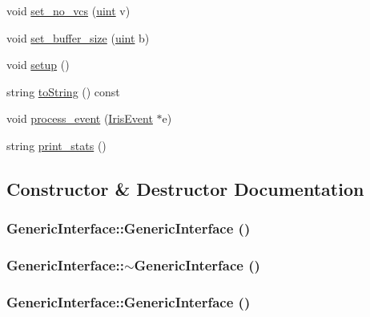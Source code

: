 \begin{CompactItemize}
void \hyperlink{classGenericInterface_10e019a3cafe243d63587656afc5e79f}{set\_\-no\_\-vcs} (\hyperlink{outputBuffer_8h_91ad9478d81a7aaf2593e8d9c3d06a14}{uint} v)
\item 
void \hyperlink{classGenericInterface_fd1cd1ccd6d355852bee1677cd8b56df}{set\_\-buffer\_\-size} (\hyperlink{outputBuffer_8h_91ad9478d81a7aaf2593e8d9c3d06a14}{uint} b)
\item 
void \hyperlink{classGenericInterface_1aaf2e40e433e913e7ea9cb68693fa7c}{setup} ()
\item 
string \hyperlink{classGenericInterface_ae1400fce0c7ba48965596ec172e474b}{toString} () const 
\item 
void \hyperlink{classGenericInterface_d56b8876204889d3c096fccd61b16b9e}{process\_\-event} (\hyperlink{classIrisEvent}{IrisEvent} $\ast$e)
\item 
string \hyperlink{classGenericInterface_b1be26f08d69932b1ac08094985eb5d6}{print\_\-stats} ()
\end{CompactItemize}


\subsection{Constructor \& Destructor Documentation}
\hypertarget{classGenericInterface_6614ccfa832a38b9cd2087f28527fa57}{
\subsubsection[{GenericInterface}]{\setlength{\rightskip}{0pt plus 5cm}GenericInterface::GenericInterface ()}}
\label{classGenericInterface_6614ccfa832a38b9cd2087f28527fa57}


\hypertarget{classGenericInterface_8543b504083542c36dc7f11e00895390}{
\subsubsection[{$\sim$GenericInterface}]{\setlength{\rightskip}{0pt plus 5cm}GenericInterface::$\sim$GenericInterface ()}}
\label{classGenericInterface_8543b504083542c36dc7f11e00895390}


\hypertarget{classGenericInterface_6614ccfa832a38b9cd2087f28527fa57}{
\subsubsection[{GenericInterface}]{\setlength{\rightskip}{0pt plus 5cm}GenericInterface::GenericInterface ()}}
\label{classGenericInterface_6614ccfa832a38b9cd2087f28527fa57}


